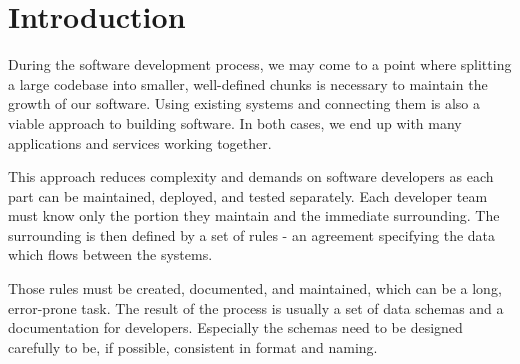 \chapter*{Introduction}


During the software development process, we may come to a point where splitting a large codebase into smaller, well-defined chunks is necessary to maintain the growth of our software. Using existing systems and connecting them is also a viable approach to building software. In both cases, we end up with many applications and services working together.

This approach reduces complexity and demands on software developers as each part can be maintained, deployed, and tested separately. Each developer team must know only the portion they maintain and the immediate surrounding. The surrounding is then defined by a set of rules - an agreement specifying the data which flows between the systems.

Those rules must be created, documented, and maintained, which can be a long, error-prone task. The result of the process is usually a set of data schemas and a documentation for developers. Especially the schemas need to be designed carefully to be, if possible, consistent in format and naming.

